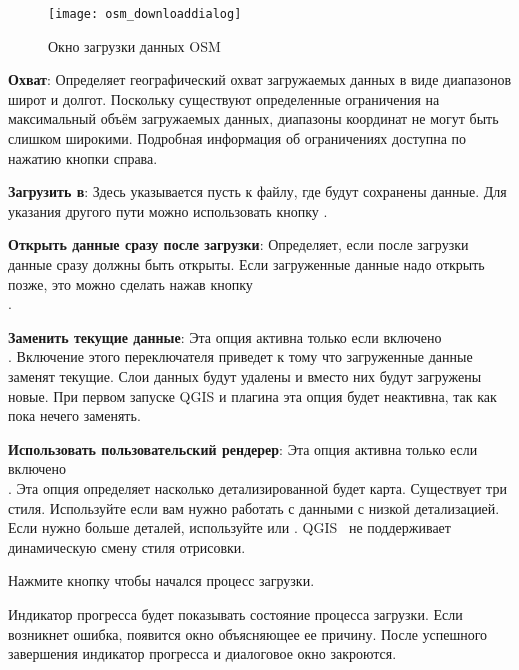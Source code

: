 \begin{figure}[ht]
   \centering
   \texttt{[image: osm\_downloaddialog]}
   \caption{Окно загрузки данных OSM \wincaption}\label{fig:osmdownload}
\end{figure}

\begin{description}
\item \textbf{Охват}: Определяет географический охват загружаемых
данных в виде диапазонов широт и долгот. Поскольку существуют
определенные ограничения на максимальный объём загружаемых данных,
диапазоны координат не могут быть слишком широкими. Подробная информация
об ограничениях доступна по нажатию кнопки
 справа.
\item \textbf{Загрузить в}: Здесь указывается пусть к файлу, где будут
сохранены данные. Для указания другого пути можно использовать кнопку
.
\item \textbf{Открыть данные сразу после загрузки}: Определяет, если
после загрузки данные сразу должны быть открыты. Если загруженные данные
надо открыть позже, это можно сделать нажав кнопку \\
.
\item \textbf{Заменить текущие данные}: Эта опция активна только если
включено \\
. Включение этого
переключателя приведет к тому что загруженные данные заменят текущие.
Слои данных будут удалены и вместо них будут загружены новые. При первом
запуске QGIS и плагина эта опция будет неактивна, так как пока нечего
заменять.
\item \textbf{Использовать пользовательский рендерер}: Эта опция
активна только если включено \\
. Эта опция
определяет насколько детализированной будет карта. Существует три стиля.
Используйте  если вам нужно работать с данными
с низкой детализацией. Если нужно больше деталей, используйте
 или . QGIS~\CURRENT
не поддерживает динамическую смену стиля отрисовки.
\end{description}

Нажмите кнопку  чтобы начался процесс загрузки.

Индикатор прогресса будет показывать состояние процесса загрузки. Если
возникнет ошибка, появится окно объясняющее ее причину. После успешного
завершения индикатор прогресса и диалоговое окно закроются.

